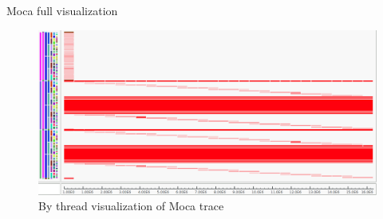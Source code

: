 \documentclass[xcolor={usenames,dvipsnames}]{beamer}
\begin{document}
\begin{frame}{Moca full visualization}
\begin{figure}
{{            }{
                \includegraphics[width=.8\linewidth]{moca_thread.png}
                \caption{By thread visualization of Moca trace}
            }
        }
    \end{figure}
    \pause
    \pause
\end{frame}
\end{document}
